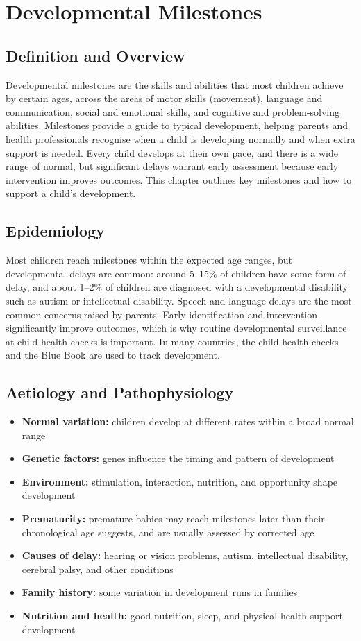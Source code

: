 \chapter{Developmental Milestones}

\section*{Definition and Overview}
Developmental milestones are the skills and abilities that most children achieve by certain ages, across the areas of motor skills (movement), language and communication, social and emotional skills, and cognitive and problem-solving abilities. Milestones provide a guide to typical development, helping parents and health professionals recognise when a child is developing normally and when extra support is needed. Every child develops at their own pace, and there is a wide range of normal, but significant delays warrant early assessment because early intervention improves outcomes. This chapter outlines key milestones and how to support a child's development.

\section*{Epidemiology}
Most children reach milestones within the expected age ranges, but developmental delays are common: around 5--15\% of children have some form of delay, and about 1--2\% of children are diagnosed with a developmental disability such as autism or intellectual disability. Speech and language delays are the most common concerns raised by parents. Early identification and intervention significantly improve outcomes, which is why routine developmental surveillance at child health checks is important. In many countries, the child health checks and the Blue Book are used to track development.

\section*{Aetiology and Pathophysiology}
\begin{itemize}
    \item \textbf{Normal variation:} children develop at different rates within a broad normal range
    \item \textbf{Genetic factors:} genes influence the timing and pattern of development
    \item \textbf{Environment:} stimulation, interaction, nutrition, and opportunity shape development
    \item \textbf{Prematurity:} premature babies may reach milestones later than their chronological age suggests, and are usually assessed by corrected age
    \item \textbf{Causes of delay:} hearing or vision problems, autism, intellectual disability, cerebral palsy, and other conditions
    \item \textbf{Family history:} some variation in development runs in families
    \item \textbf{Nutrition and health:} good nutrition, sleep, and physical health support development
\end{itemize}

